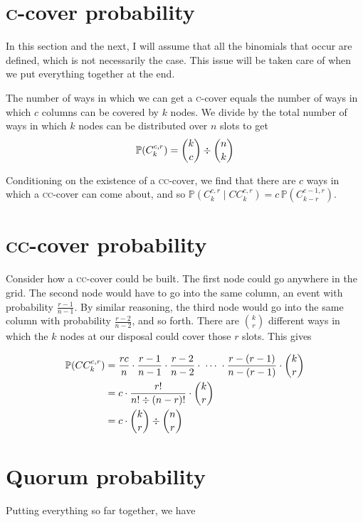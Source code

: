 \documentclass[12pt,chapterprefix=true,toc=bibliography,numbers=noendperiod,
               footnotes=multiple,twoside]{scrreprt}
\begin{document}
\section{\textsc{c}-cover probability}

In this section and the next, I will assume that all the binomials that occur are defined, which is not necessarily the case. This issue will be taken care of when we put everything together at the end.

The number of ways in which we can get a \textsc{c}-cover equals the number of ways in which \(c\) columns can be covered by \(k\) nodes. We divide by the total number of ways in which \(k\) nodes can be distributed over \(n\) slots to get \[\mathbb{P}(C^{c,r}_k) = \dbinom{k}{c} \div \dbinom{n}{k}\]

Conditioning on the existence of a \textsc{cc}-cover, we find that there are \(c\) ways in which a \textsc{cc}-cover can come about, and so \(\mathbb{P}(C^{c,r}_k\;|\;CC^{c,r}_k) = c \, \mathbb{P}(C^{c-1,r}_{k-r}) \).

\section{\textsc{cc}-cover probability}

Consider how a \textsc{cc}-cover could be built. The first node could go anywhere in the grid. The second node would have to go into the same column, an event with probability \(\frac{r-1}{n-1}\). By similar reasoning, the third node would go into the same column with probability \(\frac{r-2}{n-2}\), and so forth. There are \(\binom{k}{r}\) different ways in which the \(k\) nodes at our disposal could cover those \(r\) slots. This gives

\begin{align*}
    \mathbb{P}(CC^{c,r}_k) &= \frac{r c}{n} \cdot \frac{r-1}{n-1} \cdot \frac{r-2}{n-2} \cdot \; \cdots \; \cdot \frac{r-(r-1)}{n-(r-1)} \cdot \dbinom{k}{r} \\
    &= c \cdot \frac{r!}{n! \div (n-r)!} \cdot \dbinom{k}{r} \\
    &= c \cdot \dbinom{k}{r} \div \dbinom{n}{r}
\end{align*}

\section{Quorum probability}

Putting everything so far together, we have
\end{document}
